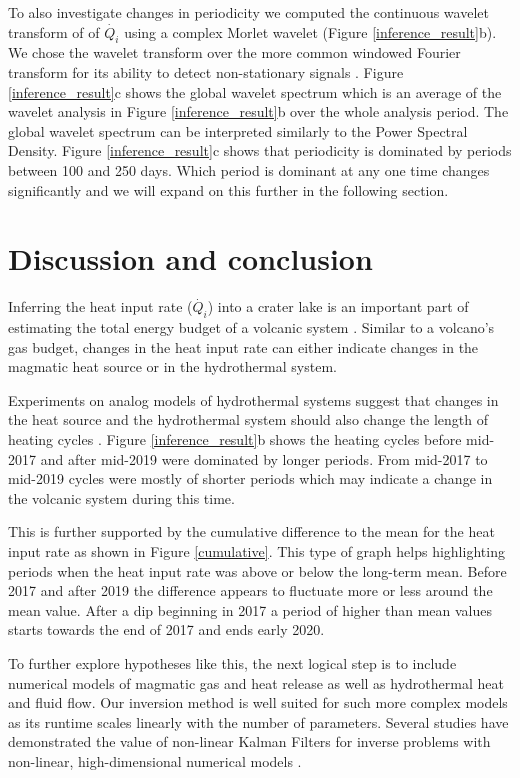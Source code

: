 \documentclass[doublespacing, linenumbers]{bmcart}
\begin{document}
To also investigate changes in periodicity we computed the continuous wavelet
transform of of $\dot{Q_i}$ using a complex Morlet wavelet (Figure
\ref{inference_result}b). We chose the wavelet transform over the more common
windowed Fourier transform for its ability to detect non-stationary signals
\cite{torrencePracticalGuideWavelet1998}. Figure \ref{inference_result}c shows
the global wavelet spectrum which is an average of the wavelet analysis in
Figure \ref{inference_result}b over the whole analysis period. The global
wavelet spectrum can be interpreted similarly to the Power Spectral Density.
Figure \ref{inference_result}c shows that periodicity is dominated by periods
between 100 and 250 days. Which period is dominant at any one time changes
significantly and we will expand on this further in the following section.  

\section{Discussion and conclusion}
Inferring the heat input rate ($\dot{Q_i}$) into a crater lake is an important
part of estimating the total energy budget of a volcanic system
\cite{Brown1989a}. Similar to a volcano's gas budget, changes in the heat input
rate can either indicate changes in the magmatic heat source or in the
hydrothermal system.

Experiments on analog models of hydrothermal systems suggest that
changes in the heat source and the hydrothermal system should also change the
length of heating cycles
\cite{vandemeulebrouckAnalogueModelingInstabilities2005,fitzgeraldStabilityTwoPhaseGeothermal1997}.
Figure \ref{inference_result}b shows the heating cycles before mid-2017 and
after mid-2019 were dominated by longer periods. From mid-2017 to mid-2019
cycles were mostly of shorter periods which may indicate a change in the
volcanic system during this time. 

This is further supported by the cumulative difference to the mean for the heat
input rate as shown in Figure \ref{cumulative}. This type of graph helps
highlighting periods when the heat input rate was above or below the long-term
mean. Before 2017 and after 2019 the difference appears to fluctuate more or
less around the mean value. After a dip beginning in 2017 a period of higher
than mean values starts towards the end of 2017 and ends early 2020. 

To further explore hypotheses like this, the next logical step is to include
numerical models of magmatic gas and heat release as well as hydrothermal heat
and fluid flow. Our inversion method is well suited for such more complex models
as its runtime scales linearly with the number of parameters. Several studies
have demonstrated the value of non-linear Kalman Filters for inverse problems
with non-linear, high-dimensional numerical models
\cite[e.g.][]{White2018a,huangIteratedKalmanMethodology2022}. 
\end{document}
